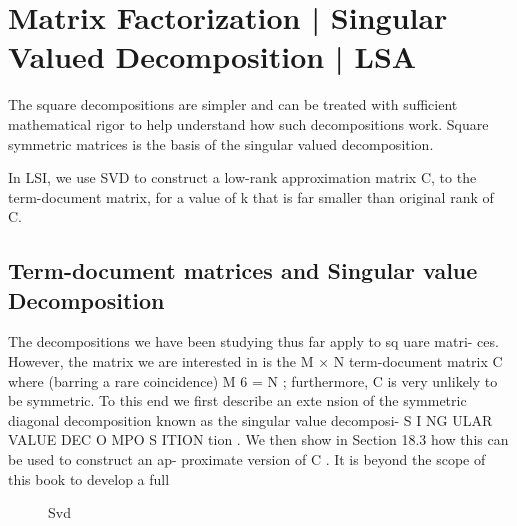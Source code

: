 \section{Matrix Factorization | Singular Valued Decomposition | LSA }
The square decompositions are simpler and can be treated with sufficient mathematical rigor to help understand how such decompositions work. Square symmetric matrices is the basis of the singular valued decomposition.

In LSI, we use SVD to construct a low-rank approximation matrix C, to the term-document matrix, for a value of k that is far smaller than original rank of C. 

\subsection{Term-document matrices and Singular value Decomposition}The decompositions we have been studying thus far apply to sq uare matri- ces.  However, the matrix we are interested in is the M × N term-document matrix C where (barring a rare coincidence) M 6 = N ; furthermore, C is very unlikely to be symmetric.  To this end we first describe an exte nsion of the symmetric  diagonal decomposition  known  as  the singular value decomposi- S I NG ULAR VALUE DEC O MPO S ITION tion .  We then show in Section 18.3 how this can be used to construct an ap- proximate version of C .  It is beyond the scope of this book to develop a full






\begin{figure}[H]
    {\par}
    \caption{Svd}
\end{figure}








